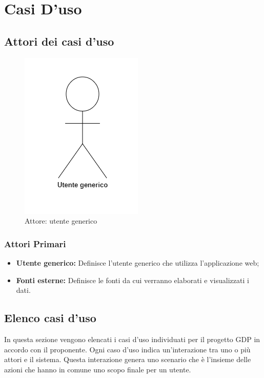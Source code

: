 \chapter{Casi D'uso}\label{casiDuso}
\section{Attori dei casi d'uso}
\begin{center}
	\begin{figure}[H]
		\includegraphics{../immagini/attori_casi/attore.png}
		\caption{Attore: utente generico}
	\end{figure}
\end{center}
\subsection{Attori Primari}\label{attoriPrimari}
\begin{itemize}
	\item \textbf{Utente generico:} Definisce l'utente generico che utilizza l'applicazione web;
	\item \textbf{Fonti esterne:} Definisce le fonti da cui verranno elaborati e visualizzati i dati.
\end{itemize}

\section{Elenco casi d'uso}\label{elencoCasiDuso}
In questa sezione vengono elencati i casi d'uso individuati per il progetto GDP in accordo con il proponente. Ogni caso d'uso indica un'interazione tra uno o più attori e il sistema. Questa interazione genera uno scenario che è l'insieme delle azioni che hanno in comune uno scopo finale per un utente.

